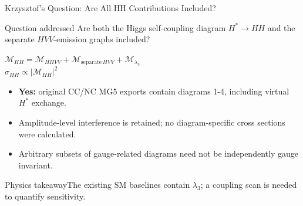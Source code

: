 \documentclass[aspectratio=1610,english]{beamer}
\newcommand{\src}[1]{\vfill{\par\color{black!65}\fontsize{6.4}{7.4}\selectfont\emph{Source:} #1\par}}
\newcommand{\key}[1]{\begin{alertblock}{Physics takeaway}\small  #1\end{alertblock}}
\begin{document}
\begin{frame}[t]{Krzysztof's Question: Are All HH Contributions Included?}
\footnotesize

\begin{alertblock}{Question addressed}
\justifying 
Are both the Higgs self-coupling diagram $H^*\to HH$ and the separate $HVV$-emission graphs included?
\end{alertblock}
\begin{center}\large
$\displaystyle \mathcal M_{HH}=\mathcal M_{HHVV}+\mathcal M_{\mathrm{separate}\,HVV}+\mathcal M_{\lambda_3}$\\[.15em]
$\displaystyle\sigma_{HH}\propto\bigl|\mathcal M_{HH}\bigr|^2$
\end{center}
\begin{itemize}
\justifying 
\item \textbf{Yes:} original CC/NC MG5 exports contain diagrams 1-4, including virtual $H^*$ exchange.
\item Amplitude-level interference is retained; no diagram-specific cross sections were calculated.
\item Arbitrary subsets of gauge-related diagrams need not be independently gauge invariant.
\end{itemize}
\key{The existing SM baselines contain $\lambda_3$; a coupling scan is needed to quantify sensitivity.}

\end{frame}
\end{document}
